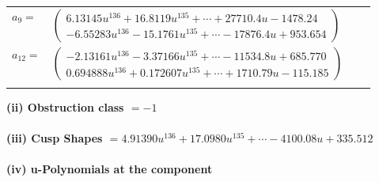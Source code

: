 \documentclass[1p]{elsarticle_modified}
\theoremstyle{definition}
\begin{document}
\begin{tabular}{m{7pt} m{180pt} m{7pt} m{180pt} }
\flushright $a_{9}=$&$\begin{pmatrix}6.13145 u^{136}+16.8119 u^{135}+\cdots+27710.4 u-1478.24\\-6.55283 u^{136}-15.1761 u^{135}+\cdots-17876.4 u+953.654\end{pmatrix}$ \\
\flushright $a_{12}=$&$\begin{pmatrix}-2.13161 u^{136}-3.37166 u^{135}+\cdots-11534.8 u+685.770\\0.694888 u^{136}+0.172607 u^{135}+\cdots+1710.79 u-115.185\end{pmatrix}$\\&\end{tabular}
\flushleft \textbf{(ii) Obstruction class $= -1$}\\~\\
\flushleft \textbf{(iii) Cusp Shapes $= 4.91390 u^{136}+17.0980 u^{135}+\cdots-4100.08 u+335.512$}\\~\\
\newpage\renewcommand{\arraystretch}{1}
\flushleft \textbf{(iv) u-Polynomials at the component}\newline \\
\end{document}
